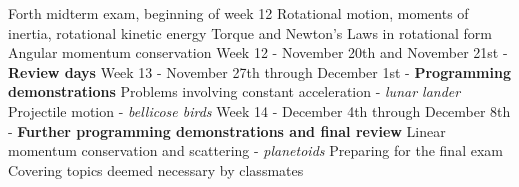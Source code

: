\documentclass[10pt]{article}
\begin{document}
\begin{outline}[enumerate]
\1 Forth midterm exam, beginning of week 12
\2 Rotational motion, moments of inertia, rotational kinetic energy
\2 Torque and Newton's Laws in rotational form
\2 Angular momentum conservation
\1 Week 12 - November 20th and November 21st - \textbf{Review days}
\1 Week 13 - November 27th through December 1st  - \textbf{Programming demonstrations}
\2 Problems involving constant acceleration - \textit{lunar lander}
\2 Projectile motion - \textit{bellicose birds}
\1 Week 14 - December 4th through December 8th - \textbf{Further programming demonstrations and final review}
\2 Linear momentum conservation and scattering - \textit{planetoids}
\2 Preparing for the final exam
\2 Covering topics deemed necessary by classmates
\end{outline}
\end{document}

